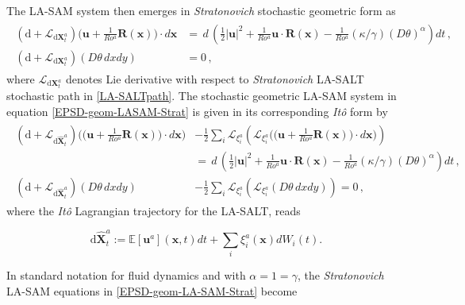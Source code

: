 \documentclass[11pt, oneside]{article}   	%
\numberwithin{equation}{section}
\theoremstyle{plain}
\theoremstyle{definition}
\theoremstyle{remark}
\newcommand{\<}{\langle}
\renewcommand{\>}{\rangle}
\def\rmd{{\mathrm{d}}}
\newcommand{\wh}[1]{\widehat{#1}}
\newcommand{\bs}[1]{\boldsymbol{#1}}
\begin{document}
The LA-SAM system then emerges in \emph{Stratonovich} stochastic geometric form as
 \begin{align}
\begin{split}
\left({\rmd} + \mathcal{L}_{{{\rmd}\mathbf{X}_{t}^{a}}} \right)  
\big( \bs{u} + \frac{1}{Ro^{a}}\bs{R}(\bs{x}) \big) \cdot d\bs{x}  
 &=  \,{d\,}\left(\frac{1}{2} |\bs{u}|^2 +  \frac{1}{Ro^{a}}\bs{u}\cdot\bs{R}(\bs{x}) 
 -\frac{1}{Ro^{a}}(\kappa/\gamma) (D\theta)^{\alpha} \right) dt
\,,\\
\left({\rmd} + \mathcal{L}_{{{\rmd}\mathbf{X}_{t}^{a}}}\right) (D\theta \,dxdy) & =  0
\,,
\end{split}
\label{EPSD-geom-LASAM-Strat}
\end{align}
where $\mathcal{L}_{{{\rmd}\mathbf{X}_{t}^{a}}}$ denotes Lie derivative with respect to \emph{Stratonovich} LA-SALT stochastic path in \eqref{LA-SALTpath}.
The stochastic geometric LA-SAM system in equation \eqref{EPSD-geom-LASAM-Strat} is given in its corresponding \emph{It\^o} form by
 \begin{align}
\begin{split}
\left({\rmd} + \mathcal{L}_{{{\rmd}\mathbf{\wh{X}}_{t}^{a}}}\right)
\Big( \big( \bs{u} + \frac{1}{Ro^{a}}\bs{R}(\bs{x}) \big) \cdot d\bs{x} \Big) 
& - \frac12  \sum_{i} \mathcal{L}_{\xi _{i}^{a}}\left(\mathcal{L}_{\xi _{i}^{a}}
\Big( \big( \bs{u} + \frac{1}{Ro^{a}}\bs{R}(\bs{x}) \big) \cdot d\bs{x} \Big) \right)
\\&=  \,{d\,}\left(\frac{1}{2} |\bs{u}|^2 +  \frac{1}{Ro^{a}}\bs{u}\cdot\bs{R}(\bs{x}) 
 -\frac{1}{Ro^{a}}(\kappa/\gamma) (D\theta)^{\alpha} \right) dt
\,,\\
\left({\rmd} + \mathcal{L}_{{{\rmd}\mathbf{\wh{X}}_{t}^{a}}}\right) (D\theta \,dxdy) 
& - \frac12  \sum_{i} \mathcal{L}_{\xi _{i}^{a}}\left(\mathcal{L}_{\xi _{i}^{a}} (D\theta \,dxdy) \right)
 =  0
\,,
\end{split}
\label{EPSD-geom-LASAM-Ito}
\end{align}
where the \emph{It\^o} Lagrangian trajectory for the LA-SALT, reads
 
\begin{equation*}
{{\rmd}\mathbf{\wh{X}}_{t}^{a}} 
:= {\mathbb{E}[\mathbf{u}^{a}]}(\bs{x},t)dt + \sum_{i}\xi _{i}^{a}(\bs{x})dW_{i}(t).
\end{equation*}



In standard notation for fluid dynamics and with $\alpha=1=\gamma$, the \emph{Stratonovich} LA-SAM equations in \eqref{EPSD-geom-LA-SAM-Strat} become
\end{document}
